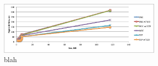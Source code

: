 \begin{figure}
\includegraphics[width=3.2in]{figs/pagerank_dblp.pdf}
\caption{blah}
\label{fig:pagerank_dblp}
\end{figure}

